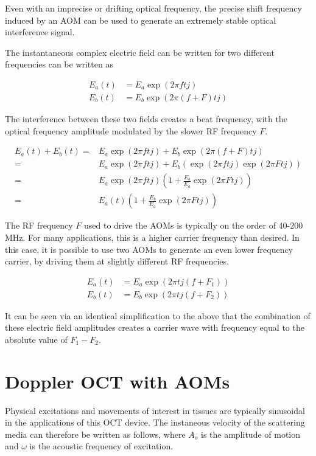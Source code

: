 Even with an imprecise or drifting optical frequency, the precise shift frequency induced by an AOM can be used to generate an extremely stable optical interference signal. \cite{hitzenberger}

The instantaneous complex electric field can be written for two different frequencies can be written as

\begin{align}
E_a(t) & = E_a \exp{(2 \pi ft j)} \\
E_b(t) & = E_b \exp{(2 \pi (f + F)t j)}
\end{align}

The interference between these two fields creates a beat frequency, with the optical frequency amplitude modulated by the slower RF frequency $F$.

\begin{align}
E_a(t) + E_b(t) = & E_a \exp{(2 \pi ftj)} + E_b \exp{(2 \pi (f + F)t j)} \\
= & E_a \exp{(2 \pi ftj)} + E_b (\exp{(2 \pi ftj)} \exp{(2 \pi Ftj)}) \\
= & E_a \exp{(2 \pi ftj)} (1 + \frac{E_b}{E_a} \exp{(2 \pi Ftj)}) \\
= & E_a(t) (1 + \frac{E_b}{E_a} \exp{(2 \pi Ftj)})
\end{align}

The RF frequency $F$ used to drive the AOMs is typically on the order of 40-200 MHz. For many applications, this is a higher carrier frequency than desired. In this case, it is possible to use two AOMs to generate an even lower frequency carrier, by driving them at slightly different RF frequencies.

\begin{align}
E_a(t) & = E_a \exp{(2 \pi t j (f + F_1))} \\
E_b(t) & = E_b \exp{(2 \pi t j (f + F_2))}
\end{align}

It can be seen via an identical simplification to the above that the combination of these electric field amplitudes creates a carrier wave with frequency equal to the absolute value of $F_1 - F_2$.

\section{Doppler OCT with AOMs}
\label{sec:doppler_aom}


Physical excitations and movements of interest in tissues are typically sinusoidal in the applications of this OCT device. The instaneous velocity of the scattering media can therefore be written as follows, where $A_o$ is the amplitude of motion and $\omega$ is the acoustic frequency of excitation.

